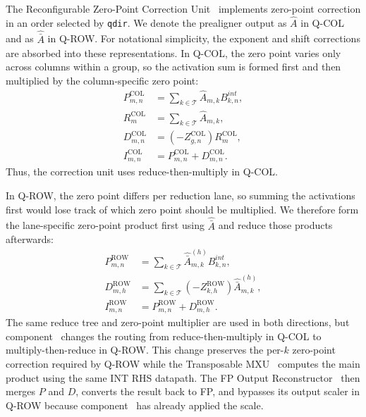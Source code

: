 \documentclass[sigconf,anonymous,nonacm]{acmart}
\newcommand{\qcol}{Q-COL}
\newcommand{\qrow}{Q-ROW}
\newcommand{\blackcircletext}[1]{%
  \tikz[baseline=-0.5ex]{
    \node[
      circle,
      fill=black,
      text=white,
      inner sep=0pt,
      minimum size=7pt,
      font=\fontsize{5}{5}\selectfont\bfseries
    ] (char) {#1};
  }%
}
\begin{document}
The Reconfigurable Zero-Point Correction Unit~\blackcircletext{2} implements zero-point correction in an order selected by \texttt{qdir}. We denote the prealigner output as $\hat{A}$ in \qcol{} and as $\hat{\bar{A}}$ in \qrow{}. For notational simplicity, the exponent and shift corrections are absorbed into these representations. In \qcol{}, the zero point varies only across columns within a group, so the activation sum is formed first and then multiplied by the column-specific zero point:
\begin{align}
    P^{\mathrm{COL}}_{m,n} &= \sum_{k \in \mathcal{T}} \hat{A}_{m,k} B^{int}_{k,n}, \\
    R^{\mathrm{COL}}_{m} &= \sum_{k \in \mathcal{T}} \hat{A}_{m,k}, \\
    D^{\mathrm{COL}}_{m,n} &= (-Z^{\mathrm{COL}}_{g,n}) R^{\mathrm{COL}}_{m}, \\
    I^{\mathrm{COL}}_{m,n} &= P^{\mathrm{COL}}_{m,n} + D^{\mathrm{COL}}_{m,n} .
    \label{eq:qcol-correction}
\end{align}
Thus, the correction unit uses reduce-then-multiply in \qcol{}.

In \qrow{}, the zero point differs per reduction lane, so summing the activations first would lose track of which zero point should be multiplied. We therefore form the lane-specific zero-point product first using $\hat{\bar{A}}$ and reduce those products afterwards:
\begin{align}
    P^{\mathrm{ROW}}_{m,n} &= \sum_{k \in \mathcal{T}} \hat{\bar{A}}^{(h)}_{m,k} B^{int}_{k,n}, \\
    D^{\mathrm{ROW}}_{m,h} &= \sum_{k \in \mathcal{T}} (-Z^{\mathrm{ROW}}_{k,h}) \hat{\bar{A}}^{(h)}_{m,k}, \\
    I^{\mathrm{ROW}}_{m,n} &= P^{\mathrm{ROW}}_{m,n} + D^{\mathrm{ROW}}_{m,h} .
    \label{eq:qrow-correction}
\end{align}
The same reduce tree and zero-point multiplier are used in both directions, but component~\blackcircletext{2} changes the routing from reduce-then-multiply in \qcol{} to multiply-then-reduce in \qrow{}. This change preserves the per-$k$ zero-point correction required by \qrow{} while the Transposable MXU~\blackcircletext{3} computes the main product using the same INT RHS datapath. The FP Output Reconstructor~\blackcircletext{4} then merges $P$ and $D$, converts the result back to FP, and bypasses its output scaler in \qrow{} because component~\blackcircletext{1} has already applied the scale.
\end{document}
